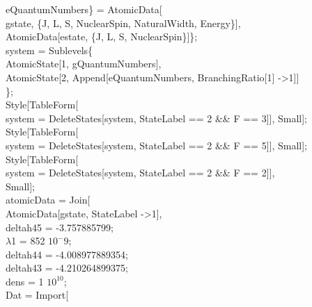    eQuantumNumbers\} = {AtomicData[\\
    gstate, \{J, L, S, NuclearSpin, NaturalWidth, Energy\}],\\
   AtomicData[estate, \{J, L, S, NuclearSpin\}]\};\\
system = Sublevels\@\{\\
    AtomicState[1, gQuantumNumbers], \\
    AtomicState[2, Append[eQuantumNumbers, BranchingRatio[1] -\textgreater 1]]\\
    \};\\
Style[TableForm[\\
   system = DeleteStates[system, StateLabel == 2 \&\& F == 3]], Small];\\
Style[TableForm[\\
   system = DeleteStates[system, StateLabel == 2 \&\& F == 5]], Small];\\
Style[TableForm[\\
   system = DeleteStates[system, StateLabel == 2 \&\& F == 2]],\\
  Small];\\
atomicData = Join[\\
   AtomicData[gstate, StateLabel -\textgreater 1],\\
   
deltah45 = -3.757885799;\\
$\lambda$1 = 852 $10^-9$;\\
deltah44 = -4.008977889354;\\
deltah43 = -4.210264899375;\\
dens = 1 $10^10$;\\

Dat = Import[\\

}
